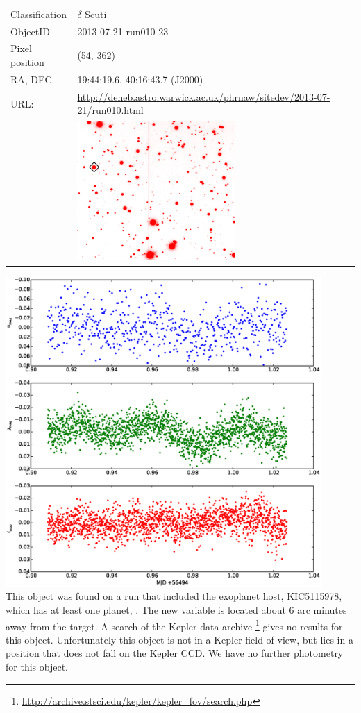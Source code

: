   \begin{tabular}{l l}
  Classification & $\delta$ Scuti \\
  ObjectID & 2013-07-21-run010-23 \\
  Pixel position & (54, 362) \\
  RA, DEC & 19:44:19.6, 40:16:43.7 (J2000) \\
  URL: & \small \url{http://deneb.astro.warwick.ac.uk/phrnaw/sitedev/2013-07-21/run010.html} \\
       & \includegraphics[width=60mm]{images/2013-07-21-run010-23.png} \\
  \end{tabular}
  \includegraphics[width=120mm]{images/2013-07-21-run010-23_lightcurve.eps} \\
  This object was found on a run that included the exoplanet host, KIC5115978, which has at least one planet, \cite{KIC5115978}. The new variable is located about 6 arc minutes away from the target. A search of the Kepler data archive \footnote{\url{http://archive.stsci.edu/kepler/kepler_fov/search.php}} gives no results for this object. Unfortunately this object is not in a Kepler field of view, but lies in a position that does not fall on the Kepler CCD. We have no further photometry for this object. 

